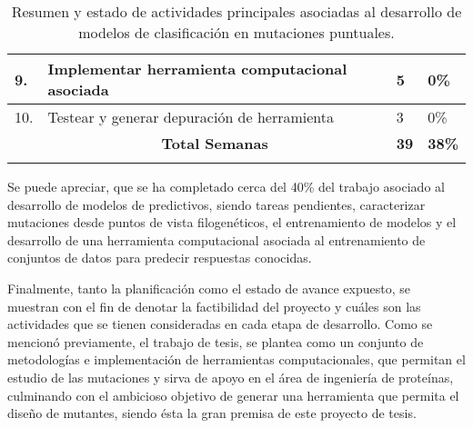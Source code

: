 \begin{longtable}[c]{l|l|l|l|}
	\multicolumn{1}{|l|}{9.} & Implementar herramienta computacional asociada & 5 & 0\% \\ \hline
	\multicolumn{1}{|l|}{10.} & Testear y generar depuración de herramienta & 3 & 0\% \\ \hline
	& \multicolumn{1}{c|}{\textbf{Total Semanas}} & \multicolumn{1}{c|}{\textbf{39}} & \textbf{38\%} \\ \cline{2-4} 
	\caption{Resumen y estado de actividades principales asociadas al desarrollo de modelos de clasificación en mutaciones puntuales.}
	\label{tab:obj4}\\
\end{longtable}

Se puede apreciar, que se ha completado cerca del 40\% del trabajo asociado al desarrollo de modelos de predictivos, siendo tareas pendientes, caracterizar mutaciones desde puntos de vista filogenéticos, el entrenamiento de modelos y el desarrollo de una herramienta computacional asociada al entrenamiento de conjuntos de datos para predecir respuestas conocidas.

Finalmente, tanto la planificación como el estado de avance expuesto, se muestran con el fin de denotar la factibilidad del proyecto y cuáles son las actividades que se tienen consideradas en cada etapa de desarrollo. Como se mencionó previamente, el trabajo de tesis, se plantea como un conjunto de metodologías e implementación de herramientas computacionales, que permitan el estudio de las mutaciones y sirva de apoyo en el área de ingeniería de proteínas, culminando con el ambicioso objetivo de generar una herramienta que permita el diseño de mutantes, siendo ésta la gran premisa de este proyecto de tesis.